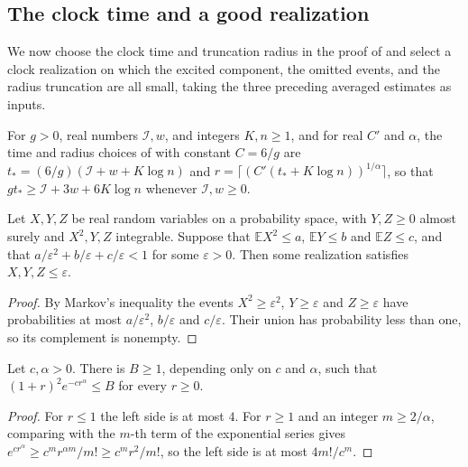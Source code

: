 \subsection{The clock time and a good realization}

We now choose the clock time and truncation radius in the proof of
\cite[Proposition~10.2]{OpenAI2026AreaLaw} and select a clock
realization on which the excited component, the omitted events, and the radius
truncation are all small, taking the three preceding averaged estimates as
inputs.

\begin{definition}
    \label{def:area_law_amplification_time_radius}
    \leanok
    For $g>0$, real numbers $\mathcal I,w$, and integers $K,n\ge1$, and for real
    $C'$ and $\alpha$, the time and radius choices of
    \cite[Proposition~10.2]{OpenAI2026AreaLaw} with constant $C=6/g$ are
    $t_*=(6/g)(\mathcal I+w+K\log n)$ and
    $r=\lceil(C'(t_*+K\log n))^{1/\alpha}\rceil$,
    so that $gt_*\ge\mathcal I+3w+6K\log n$ whenever
    $\mathcal I,w\ge0$.
\end{definition}

\begin{lemma}
    \label{thm:area_law_amplification_three_failures}
    \leanok
    Let $X,Y,Z$ be real random variables on a probability space, with
    $Y,Z\ge0$ almost surely and $X^2,Y,Z$ integrable. Suppose that
    $\mathbb EX^2\le a$, $\mathbb EY\le b$ and $\mathbb EZ\le c$, and that
    $a/\varepsilon^2+b/\varepsilon+c/\varepsilon<1$ for some
    $\varepsilon>0$. Then some realization satisfies
    $X,Y,Z\le\varepsilon$.
\end{lemma}
\begin{proof}
    \leanok
    By Markov's inequality the events $X^2\ge\varepsilon^2$,
    $Y\ge\varepsilon$ and $Z\ge\varepsilon$ have probabilities at most
    $a/\varepsilon^2$, $b/\varepsilon$ and $c/\varepsilon$. Their union has
    probability less than one, so its complement is nonempty.
\end{proof}

\begin{lemma}
    \label{thm:area_law_amplification_poly_stretched_exp}
    \leanok
    Let $c,\alpha>0$. There is $B\ge1$, depending only on $c$ and $\alpha$,
    such that $(1+r)^2e^{-cr^\alpha}\le B$ for every $r\ge0$.
\end{lemma}
\begin{proof}
    \leanok
    For $r\le1$ the left side is at most $4$. For $r\ge1$ and an integer
    $m\ge2/\alpha$, comparing with the $m$-th term of the exponential series
    gives $e^{cr^\alpha}\ge c^mr^{\alpha m}/m!\ge c^mr^2/m!$, so the left side
    is at most $4m!/c^m$.
\end{proof}

